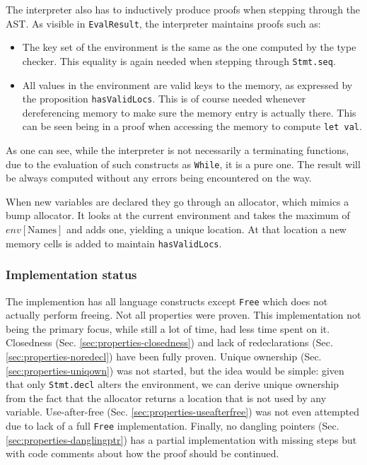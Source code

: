 The interpreter also has to inductively produce proofs when stepping through the AST. As visible in \texttt{EvalResult}, the interpreter maintains proofs such as:

\begin{itemize}
  \item The key set of the environment is the same as the one computed by the type checker. This equality is again needed when stepping through \texttt{Stmt.seq}.
  \item All values in the environment are valid keys to the memory, as expressed by the proposition \texttt{hasValidLocs}. This is of course needed whenever dereferencing memory to make sure the memory entry is actually there. This can be seen being in a proof when accessing the memory to compute \lstinline[language=lean]{let val}.
\end{itemize}

As one can see, while the interpreter is not necessarily a terminating functions, due to the evaluation of such constructs as \texttt{While}, it is a pure one. The result will be always computed without any errors being encountered on the way.

When new variables are declared they go through an allocator, which mimics a bump allocator. It looks at the current environment and takes the maximum of $env[\text{Names}]$ and adds one, yielding a unique location. At that location a new memory cells is added to maintain \texttt{hasValidLocs}.

\subsubsection{Implementation status}

The implemention has all language constructs except \texttt{Free} which does not actually perform freeing. Not all properties were proven. This implementation not being the primary focus, while still a lot of time, had less time spent on it. Closedness (Sec. \ref{sec:properties-closedness}) and lack of redeclarations (Sec. \ref{sec:properties-noredecl}) have been fully proven. Unique ownership (Sec. \ref{sec:properties-uniqown}) was not started, but the idea would be simple: given that only \texttt{Stmt.decl} alters the environment, we can derive unique ownership from the fact that the allocator returns a location that is not used by any variable. Use-after-free (Sec. \ref{sec:properties-useafterfree}) was not even attempted due to lack of a full \texttt{Free} implementation. Finally, no dangling pointers (Sec. \ref{sec:properties-danglingptr}) has a partial implementation with missing steps but with code comments about how the proof should be continued.

